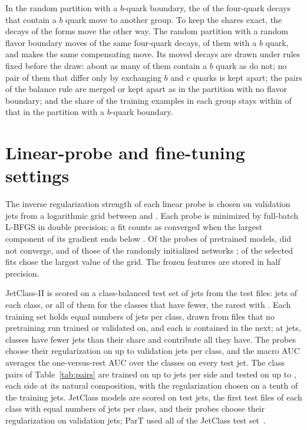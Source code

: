 \documentclass[11pt]{article}
\newcommand{\Kfull}{\VocabSizeLoneeighteight}
\begin{document}
In the random partition with a $b$-quark boundary, the \RandFlavCutClasses{} of the
\RandFlavSplitOrbitClasses{} four-quark decays \RandFlavSplitOrbit{} that contain a $b$ quark
move to another group. To keep the shares exact, the \RandFlavOrbitClassesMoved{} decays of
the forms \RandFlavOrbitsMovedList{} move the other way. The random partition with a random
flavor boundary moves \RandFlavCutClasses{} of the same four-quark decays,
\RandFlavFonerCutWithB{} of them with a $b$ quark, and makes the same compensating move. Its
moved decays are drawn under rules fixed before the draw: about as many of them contain a $b$
quark as do not; no pair of them that differ only by exchanging $b$ and $c$ quarks is kept
apart; the pairs of the balance rule are merged or kept apart as in the partition with no
flavor boundary; and the share of the training examples in each group stays within
\RandFlavFonerShareTol{} of that in the partition with a $b$-quark boundary.



\section{Linear-probe and fine-tuning settings}\label{app:ftrecipe}

The inverse regularization strength of each linear probe is chosen on validation jets from a
logarithmic grid between \LpCMin{} and \LpVfourCMax. Each probe is minimized by full-batch L-BFGS in
double precision; a fit counts as converged when the largest component of its gradient ends below
\LpConvergedGrad. Of the probes of pretrained models, \MlstProbeUnconverged{} did not converge, and
of those of the randomly initialized networks \MlstProbeUnconvergedInit; \MlstProbeEdgeC{} of the
\MlstProbeFits{} selected fits chose the largest value of the grid. The frozen features are stored
in half precision.

JetClass-II is scored on a class-balanced test set of \JcBalNTest{} jets from the test files:
\JcBalTestPerClass{} jets of each class, or all of them for the \JcBalNShort{} classes that have
fewer, the rarest with \JcBalRarestTest. Each training set holds equal numbers of jets per class,
drawn from files that no pretraining run trained or validated on, and each is contained in the next;
at \FtSizeESix{} jets, \JcBalShortTrainESix{} classes have fewer jets than their share and contribute
all they have. The probes choose their regularization on up to \JcBalValPerClass{} validation jets
per class, and the macro AUC averages the one-versus-rest AUC over the \Kfull{} classes on every test
jet. The class pairs of Table~\ref{tab:pairs} are trained on up to \JcBalPairTrainPerSide{} jets per
side and tested on up to \JcBalPairTestPerSide, each side at its natural composition, with the
regularization chosen on a tenth of the training jets. JetClass models are scored on \LpNTestJci{}
test jets, the first test files of each class with equal numbers of jets per class, and their probes
choose their regularization on \LpNValJci{} validation jets; ParT used all of the JetClass test
set~\cite{part}.
\end{document}
